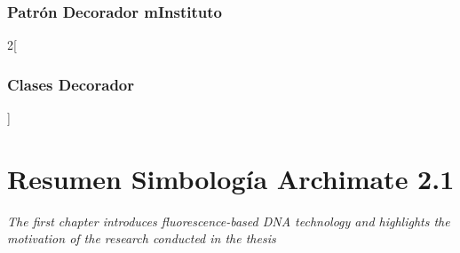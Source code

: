 \subsection{Patrón Decorador mInstituto}
\blindtext

\begin{multicols}{2}[\subsection{Clases Decorador}]
	
	
	
	
	
\end{multicols}

\chapter{Resumen Simbología Archimate 2.1}
\label{apex:anexos}
\textit{The first chapter introduces fluorescence-based DNA technology and highlights the motivation of the research conducted in the thesis}
\vfill
\minitoc
\newpage

